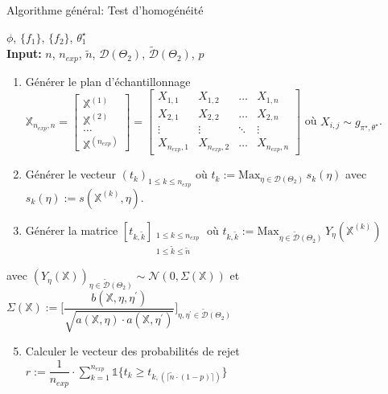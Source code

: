 \documentclass{article}
\begin{document}
    \begin{algorithm}[h!]
    \caption{Algorithme général: Test d'homogénéité}
        \Apriori $\phi$, $\{f_1\}$, $\{f_2\}$, $\theta_1^\star$ \\
        \vspace*{0.2cm}
        \textbf{Input:} $n$, $n_{exp}$, $\tilde{n}$, $\mathcal{D}(\Theta_2)$, $\tilde{\mathcal{D}}(\Theta_2)$, $p$ \\
        \begin{enumerate}
            \item Générer le plan d'échantillonnage $\mathbb{X}_{n_{exp},n} = 
            \begin{bmatrix}
                \mathbb{X}^{(1)} \\
                \mathbb{X}^{(2)} \\
                \ldots \\
                \mathbb{X}^{(n_{exp})}
            \end{bmatrix} =
            \begin{bmatrix}
                X_{1,1} & X_{1,2} & \ldots & X_{1,n} \\
                X_{2,1} & X_{2,2} & \ldots & X_{2,n} \\
                \vdots  & \vdots  & \ddots & \vdots  \\
                X_{n_{exp},1} & X_{n_{exp},2} & \ldots & X_{n_{exp},n}
            \end{bmatrix}$ 
            où $X_{i,j} \sim g_{\pi^\star,\theta^\star}$. \hfill \break       
            \item Générer le vecteur $(t_k)_{1\leq k\leq n_{exp}}$ où $t_k := \textrm{Max}_{\eta\in\mathcal{D}(\Theta_2)}\, s_k(\eta)$ avec $s_k(\eta) := s(\mathbb{X}^{(k)},\eta)$. \vspace*{0.2cm}
            \item Générer la matrice $[t_{k,\tilde{k}}]_{\substack{1\leq k\leq n_{exp} \\ 1\leq\tilde{k}\leq\tilde{n}}}$ où $t_{k,\tilde{k}}:=\mathrm{Max}_{\eta\in\tilde{\mathcal{D}}(\Theta_2)}\,Y_\eta(\mathbb{X}^{(k)})$
        \end{enumerate}
        \begin{flushright}
            avec $(Y_\eta(\mathbb{X}))_{\eta\in\tilde{\mathcal{D}}(\Theta_2)}\sim\mathcal{N}(0,\Sigma(\mathbb{X}))$ et $\Sigma(\mathbb{X}):=\Big[\dfrac{b(\mathbb{X,\eta,\eta^\prime})}{\sqrt{a(\mathbb{X},\eta)\cdot{}a(\mathbb{X},\eta^\prime)}}\Big]_{\eta,\eta^\prime\in\tilde{\mathcal{D}}(\Theta_2)}$
        \end{flushright}
        \begin{enumerate}
        \setcounter{enumi}{4}
            \item Calculer le vecteur des probabilités de rejet $r:=\dfrac{1}{n_{exp}}\cdot\sum_{k=1}^{n_{exp}}\mathbb{1}\{t_k\geq t_{k,(\lceil \tilde{n}\cdot (1-p) \rceil)}\}$
        \end{enumerate}
    \end{algorithm}
\end{document}
